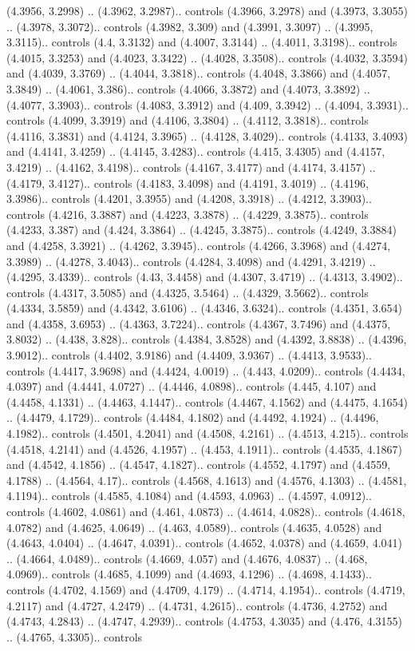 (4.3956, 3.2998) .. (4.3962, 3.2987).. controls (4.3966, 3.2978) and (4.3973, 3.3055) .. (4.3978, 3.3072).. controls (4.3982, 3.309) and (4.3991, 3.3097) .. (4.3995, 3.3115).. controls (4.4, 3.3132) and (4.4007, 3.3144) .. (4.4011, 3.3198).. controls (4.4015, 3.3253) and (4.4023, 3.3422) .. (4.4028, 3.3508).. controls (4.4032, 3.3594) and (4.4039, 3.3769) .. (4.4044, 3.3818).. controls (4.4048, 3.3866) and (4.4057, 3.3849) .. (4.4061, 3.386).. controls (4.4066, 3.3872) and (4.4073, 3.3892) .. (4.4077, 3.3903).. controls (4.4083, 3.3912) and (4.409, 3.3942) .. (4.4094, 3.3931).. controls (4.4099, 3.3919) and (4.4106, 3.3804) .. (4.4112, 3.3818).. controls (4.4116, 3.3831) and (4.4124, 3.3965) .. (4.4128, 3.4029).. controls (4.4133, 3.4093) and (4.4141, 3.4259) .. (4.4145, 3.4283).. controls (4.415, 3.4305) and (4.4157, 3.4219) .. (4.4162, 3.4198).. controls (4.4167, 3.4177) and (4.4174, 3.4157) .. (4.4179, 3.4127).. controls (4.4183, 3.4098) and (4.4191, 3.4019) .. (4.4196, 3.3986).. controls (4.4201, 3.3955) and (4.4208, 3.3918) .. (4.4212, 3.3903).. controls (4.4216, 3.3887) and (4.4223, 3.3878) .. (4.4229, 3.3875).. controls (4.4233, 3.387) and (4.424, 3.3864) .. (4.4245, 3.3875).. controls (4.4249, 3.3884) and (4.4258, 3.3921) .. (4.4262, 3.3945).. controls (4.4266, 3.3968) and (4.4274, 3.3989) .. (4.4278, 3.4043).. controls (4.4284, 3.4098) and (4.4291, 3.4219) .. (4.4295, 3.4339).. controls (4.43, 3.4458) and (4.4307, 3.4719) .. (4.4313, 3.4902).. controls (4.4317, 3.5085) and (4.4325, 3.5464) .. (4.4329, 3.5662).. controls (4.4334, 3.5859) and (4.4342, 3.6106) .. (4.4346, 3.6324).. controls (4.4351, 3.654) and (4.4358, 3.6953) .. (4.4363, 3.7224).. controls (4.4367, 3.7496) and (4.4375, 3.8032) .. (4.438, 3.828).. controls (4.4384, 3.8528) and (4.4392, 3.8838) .. (4.4396, 3.9012).. controls (4.4402, 3.9186) and (4.4409, 3.9367) .. (4.4413, 3.9533).. controls (4.4417, 3.9698) and (4.4424, 4.0019) .. (4.443, 4.0209).. controls (4.4434, 4.0397) and (4.4441, 4.0727) .. (4.4446, 4.0898).. controls (4.445, 4.107) and (4.4458, 4.1331) .. (4.4463, 4.1447).. controls (4.4467, 4.1562) and (4.4475, 4.1654) .. (4.4479, 4.1729).. controls (4.4484, 4.1802) and (4.4492, 4.1924) .. (4.4496, 4.1982).. controls (4.4501, 4.2041) and (4.4508, 4.2161) .. (4.4513, 4.215).. controls (4.4518, 4.2141) and (4.4526, 4.1957) .. (4.453, 4.1911).. controls (4.4535, 4.1867) and (4.4542, 4.1856) .. (4.4547, 4.1827).. controls (4.4552, 4.1797) and (4.4559, 4.1788) .. (4.4564, 4.17).. controls (4.4568, 4.1613) and (4.4576, 4.1303) .. (4.4581, 4.1194).. controls (4.4585, 4.1084) and (4.4593, 4.0963) .. (4.4597, 4.0912).. controls (4.4602, 4.0861) and (4.461, 4.0873) .. (4.4614, 4.0828).. controls (4.4618, 4.0782) and (4.4625, 4.0649) .. (4.463, 4.0589).. controls (4.4635, 4.0528) and (4.4643, 4.0404) .. (4.4647, 4.0391).. controls (4.4652, 4.0378) and (4.4659, 4.041) .. (4.4664, 4.0489).. controls (4.4669, 4.057) and (4.4676, 4.0837) .. (4.468, 4.0969).. controls (4.4685, 4.1099) and (4.4693, 4.1296) .. (4.4698, 4.1433).. controls (4.4702, 4.1569) and (4.4709, 4.179) .. (4.4714, 4.1954).. controls (4.4719, 4.2117) and (4.4727, 4.2479) .. (4.4731, 4.2615).. controls (4.4736, 4.2752) and (4.4743, 4.2843) .. (4.4747, 4.2939).. controls (4.4753, 4.3035) and (4.476, 4.3155) .. (4.4765, 4.3305).. controls 